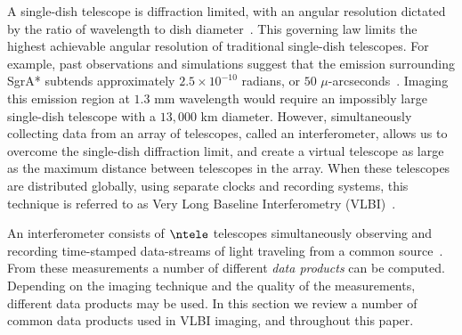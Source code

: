 \begin{figure}[h!]
\begin{center}
		\label{fig:amplandphase}
	\end{center}
	\vspace{-.2in}
\end{figure}

A single-dish telescope is diffraction limited, with an angular resolution dictated by the ratio of wavelength to dish diameter~\cite{TMS}. This governing law limits the highest achievable angular resolution of traditional single-dish telescopes. For example, past observations and simulations suggest that the emission surrounding SgrA* subtends approximately $2.5 \times 10^{-10}$ radians, or $50$ $\mu$-arcseconds~\cite{Doeleman_2008}. Imaging this emission region at $1.3$ mm wavelength would require an impossibly large single-dish telescope with a $13,000$ km diameter. However, simultaneously collecting data from an array of telescopes, called an interferometer, allows us to overcome the single-dish diffraction limit, and create a virtual telescope as large as the maximum distance between telescopes in the array. When these telescopes are distributed globally, using separate clocks and recording systems, this technique is referred to as Very Long Baseline Interferometry (VLBI)~\cite{TMS}. 


An interferometer consists of $\ntele$ telescopes simultaneously observing and recording time-stamped data-streams of light traveling from a common source~\cite{TMS}.
From these measurements a number of different {\it data products} can be computed. 
Depending on the imaging technique and the quality of the measurements, different data products may be used. In this section we review a number of common data products used in VLBI imaging, and throughout this paper. 



